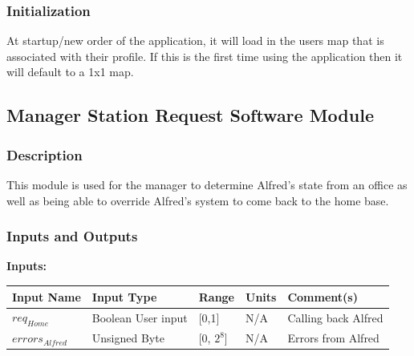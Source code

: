 \documentclass [10pt]{article}
\begin{document}

\subsubsection{Initialization}
At startup/new order of the application, it will load in the users map that is associated with their profile. If this is the first time using the application then it will default to a 1x1 map.


\subsection{Manager Station Request Software Module}


\subsubsection{Description}
This module is used for the manager to determine Alfred's state from an office as well as being able to override Alfred's system to come back to the home base. 


\subsubsection{Inputs and Outputs}

\textbf{Inputs: } \\

\begin{longtable}{|l|l|l|l|l|}\hline 
	\rowcolor{tableCell}\textbf{Input Name} & \textbf{Input Type} & \textbf{Range} & \textbf{Units} & \textbf{Comment(s)} \\ \hline
	$ req_{Home} $ & Boolean User input &  [0,1] & N/A & Calling back Alfred \\ \hline
	\rowcolor{tableCell}$  errors_{Alfred} $ & Unsigned Byte & [0, $2^{8}$]& N/A & Errors from Alfred \\ \hline
\end{longtable}
\end{document}
